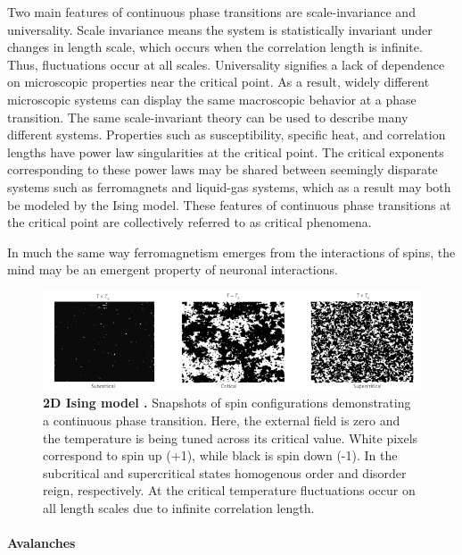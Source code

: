\documentclass[12pt]{article}
\begin{document}
Two main features of continuous phase transitions are scale-invariance and universality. Scale invariance means the system is statistically invariant under changes in length scale, which occurs when the correlation length is infinite. Thus, fluctuations occur at all scales. Universality signifies a lack of dependence on microscopic properties near the critical point. As a result, widely different microscopic systems can display the same macroscopic behavior at a phase transition. The same scale-invariant theory can be used to describe many different systems. Properties such as susceptibility, specific heat, and correlation lengths have power law singularities at the critical point. The critical exponents corresponding to these power laws  may be shared between seemingly disparate systems such as ferromagnets and liquid-gas systems, which as a result may both be modeled by the Ising model. These features of continuous phase transitions at the critical point are collectively referred to as critical phenomena.

In much the same way ferromagnetism emerges from the interactions of spins, the mind may be an emergent property of neuronal interactions. 

\begin{figure}      
  \begin{center}    
 \includegraphics[width=1\textwidth]{Isingchialvo}    
    \caption{\textbf{2D Ising model \cite{Chialvo2010a}.} Snapshots of spin configurations demonstrating a continuous phase transition. Here, the external field is zero and the temperature is being tuned across its critical value. White pixels correspond to spin up (+1), while black is spin down (-1). In the subcritical and supercritical states homogenous order and disorder reign, respectively. At the critical temperature fluctuations occur on all length scales due to infinite correlation length.}  
   \label{Figure::Ising model criticality}   
  \end{center}     
   \end{figure}
 
\paragraph*{Avalanches}
\end{document}
